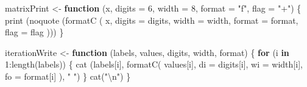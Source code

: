 \documentclass[
  12pt,
]{book}
\newenvironment{Shaded}{\begin{snugshade}}{\end{snugshade}}
\newcommand{\AttributeTok}[1]{\textcolor[rgb]{0.77,0.63,0.00}{#1}}
\newcommand{\ControlFlowTok}[1]{\textcolor[rgb]{0.13,0.29,0.53}{\textbf{#1}}}
\newcommand{\DecValTok}[1]{\textcolor[rgb]{0.00,0.00,0.81}{#1}}
\newcommand{\FunctionTok}[1]{\textcolor[rgb]{0.00,0.00,0.00}{#1}}
\newcommand{\NormalTok}[1]{#1}
\newcommand{\OtherTok}[1]{\textcolor[rgb]{0.56,0.35,0.01}{#1}}
\newcommand{\SpecialCharTok}[1]{\textcolor[rgb]{0.00,0.00,0.00}{#1}}
\newcommand{\StringTok}[1]{\textcolor[rgb]{0.31,0.60,0.02}{#1}}
\theoremstyle{definition}
\theoremstyle{definition}
\theoremstyle{definition}
\theoremstyle{definition}
\theoremstyle{remark}
\begin{document}
\begin{Shaded}
\begin{Highlighting}[]
\NormalTok{matrixPrint }\OtherTok{\textless{}{-}} \ControlFlowTok{function}\NormalTok{ (x,}
                    \AttributeTok{digits =} \DecValTok{6}\NormalTok{,}
                    \AttributeTok{width =} \DecValTok{8}\NormalTok{,}
                    \AttributeTok{format =} \StringTok{"f"}\NormalTok{,}
                    \AttributeTok{flag =} \StringTok{"+"}\NormalTok{) \{}
  \FunctionTok{print}\NormalTok{ (}\FunctionTok{noquote}\NormalTok{ (}\FunctionTok{formatC}\NormalTok{ (}
\NormalTok{    x,}
    \AttributeTok{digits =}\NormalTok{ digits,}
    \AttributeTok{width =}\NormalTok{ width,}
    \AttributeTok{format =}\NormalTok{ format,}
    \AttributeTok{flag =}\NormalTok{ flag}
\NormalTok{  )))}
\NormalTok{\}}

\NormalTok{iterationWrite }\OtherTok{\textless{}{-}} \ControlFlowTok{function}\NormalTok{ (labels, values, digits, width, format) \{}
  \ControlFlowTok{for}\NormalTok{ (i }\ControlFlowTok{in} \DecValTok{1}\SpecialCharTok{:}\FunctionTok{length}\NormalTok{(labels)) \{}
    \FunctionTok{cat}\NormalTok{ (labels[i],}
         \FunctionTok{formatC}\NormalTok{(}
\NormalTok{           values[i],}
           \AttributeTok{di =}\NormalTok{ digits[i],}
           \AttributeTok{wi =}\NormalTok{ width[i],}
           \AttributeTok{fo =}\NormalTok{ format[i]}
\NormalTok{         ),}
         \StringTok{" "}\NormalTok{)}
\NormalTok{  \}}
  \FunctionTok{cat}\NormalTok{(}\StringTok{"}\SpecialCharTok{\textbackslash{}n}\StringTok{"}\NormalTok{)}
\NormalTok{\}}


\end{Highlighting}
\end{Shaded}
\end{document}
